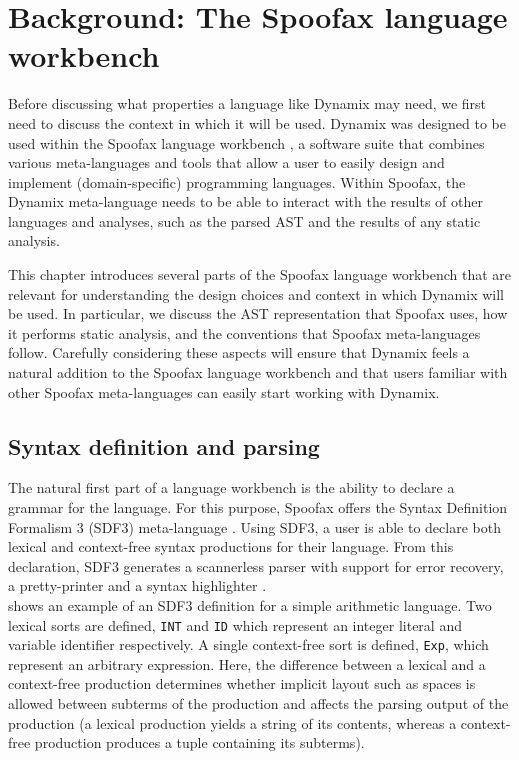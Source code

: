 
\chapter{\label{ch:spoofax}Background: The Spoofax language workbench}

Before discussing what properties a language like Dynamix may need, we first need to discuss the context in which it will be used. Dynamix was designed to be used within the Spoofax language workbench \cite{Spoofax2021}, a software suite that combines various meta-languages and tools that allow a user to easily design and implement (domain-specific) programming languages. Within Spoofax, the Dynamix meta-language needs to be able to interact with the results of other languages and analyses, such as the parsed \ac{AST} and the results of any static analysis.

This chapter introduces several parts of the Spoofax language workbench that are relevant for understanding the design choices and context in which Dynamix will be used. In particular, we discuss the \ac{AST} representation that Spoofax uses, how it performs static analysis, and the conventions that Spoofax meta-languages follow. Carefully considering these aspects will ensure that Dynamix feels a natural addition to the Spoofax language workbench and that users familiar with other Spoofax meta-languages can easily start working with Dynamix.


\section{\label{sec:spoofax_parsing_aterm}Syntax definition and parsing}

The natural first part of a language workbench is the ability to declare a grammar for the language. For this purpose, Spoofax offers the Syntax Definition Formalism 3 (SDF3) meta-language \cite{Amorim2019}. Using SDF3, a user is able to declare both lexical and context-free syntax productions for their language. From this declaration, SDF3 generates a scannerless parser with support for error recovery, a pretty-printer and a syntax highlighter \cite{AmorimV20}.\\

 shows an example of an SDF3 definition for a simple arithmetic language. Two lexical sorts are defined, \texttt{INT} and \texttt{ID} which represent an integer literal and variable identifier respectively. A single context-free sort is defined, \texttt{Exp}, which represent an arbitrary expression. Here, the difference between a lexical and a context-free production determines whether implicit layout such as spaces is allowed between subterms of the production and affects the parsing output of the production (a lexical production yields a string of its contents, whereas a context-free production produces a tuple containing its subterms).\\

